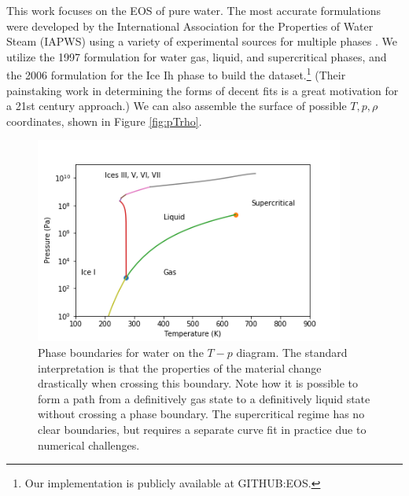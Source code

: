 \documentclass[]{article}
\begin{document}
This work focuses on the EOS of pure water. The most accurate
formulations were developed by the International Association for the
Properties of Water Steam (IAPWS) using a variety of experimental
sources for multiple phases \cite{wagner_iapws_2000,
  water_revised_2007, water_revised_2009}. We utilize the 1997
formulation for water gas, liquid, and supercritical phases, and the
2006 formulation for the Ice Ih phase to build the dataset.\footnote{Our
implementation is publicly available at GITHUB:EOS.} (Their
painstaking work in determining the forms of decent fits is a great
motivation for a 21st century approach.)
We can also assemble the surface of possible $T,p,\rho$ coordinates,
shown in Figure \ref{fig:pTrho}.
\begin{figure}
\centering
\includegraphics[width=4in]{../figures/phase_diagram.png}
\caption{\label{fig:phaseboundaries}Phase boundaries for water on the $T-p$ diagram. The standard
interpretation is that the properties of the material change
drastically when crossing this boundary. Note how it is possible to form a path from a
definitively gas state to a definitively liquid state without crossing
a phase boundary. The supercritical regime has no clear boundaries,
but requires a separate curve fit in practice due to numerical challenges.}
\end{figure}
\end{document}
